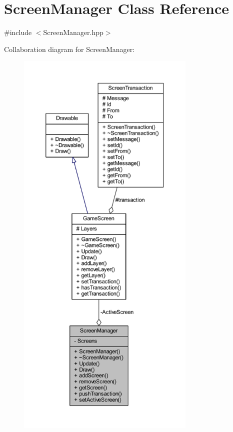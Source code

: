 \hypertarget{class_screen_manager}{\section{Screen\-Manager Class Reference}
\label{class_screen_manager}
}


{\ttfamily \#include $<$Screen\-Manager.\-hpp$>$}



Collaboration diagram for Screen\-Manager\-:
\nopagebreak
\begin{figure}[H]
\begin{center}
\leavevmode
\includegraphics[height=550pt]{class_screen_manager__coll__graph}
\end{center}
\end{figure}
